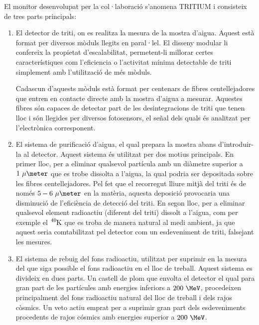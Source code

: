 El monitor desenvolupat per la col·laboració s'anomena TRITIUM i consisteix de tres parts principals:

\begin{enumerate}

\item{} El detector de triti, on es realitza la mesura de la mostra d'aigua. Aquest està format per diversos mòduls llegits en paral·lel. El disseny modular li confereix la propietat d'escalabilitat, permetent-li millorar certes característiques com l'eficiencia o l'activitat mínima detectable de triti simplement amb l'utilització de més mòduls.

Cadascun d'aquests mòduls està format per centenars de fibres centellejadores que entren en contacte directe amb la mostra d'aigua a mesurar. Aquestes fibres són capaces de detectar part de les desintegracions de triti que tenen lloc i són llegides per diversos fotosensors, el señal dels quals és analitzat per l'electrònica corresponent.

\item{} El sistema de purificació d'aigua, el qual prepara la mostra abans d'introduir-la al detector. Aquest sistema és utilitzat per dos motius principals. En primer lloc, per a eliminar qualsevol partícula amb un diàmetre superior a $1~\mu\meter$ que es trobe dissolta a l'aigua, la qual podria ser depositada sobre les fibres centellejadores. Pel fet que el recorregut lliure mitjà del triti és de només $5-6~\mu\meter$ en la matèria, aquesta deposició provocaria una disminució de l'eficiència de detecció del triti. En segon lloc, per a eliminar qualsevol element radioactiu (diferent del triti) dissolt a l'aigua, com per exemple el $\ce{^{40}K}$ que es troba de manera natural al medi ambient, ja que aquest seria comtabilitzat pel detector com un esdeveniment de triti, falsejant les mesures.

\item{} El sistema de rebuig del fons radioactiu, utilitzat per suprimir en la mesura del que siga possible el fons radioactiu en el lloc de treball. Aquest sistema es divideix en dues parts. Un castell de plom que envolta el detector el qual para gran part de les partícules amb energies inferiors a $200~\MeV$, procedeixen principalment del fons radioactiu natural del lloc de treball i dels rajos còsmics. Un veto actiu emprat per a suprimir gran part dels esdeveniments procedents de rajos cósmics amb energies superior a $200~\MeV$.

\end{enumerate}

